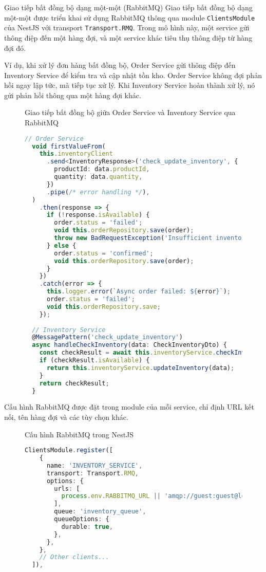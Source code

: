 Giao tiếp bất đồng bộ dạng một-một (RabbitMQ)
Giao tiếp bất đồng bộ dạng một-một được triển khai sử dụng RabbitMQ thông qua module \texttt{ClientsModule} của NestJS với transport \texttt{Transport.RMQ}. Trong mô hình này, một service gửi thông điệp đến một hàng đợi, và một service khác tiêu thụ thông điệp từ hàng đợi đó.

Ví dụ, khi xử lý đơn hàng bất đồng bộ, Order Service gửi thông điệp đến Inventory Service để kiểm tra và cập nhật tồn kho. Order Service không đợi phản hồi ngay lập tức, mà tiếp tục xử lý. Khi Inventory Service hoàn thành xử lý, nó gửi phản hồi thông qua một hàng đợi khác.

\begin{figure}[H]{Giao tiếp bất đồng bộ giữa Order Service và Inventory Service qua RabbitMQ}
  \centering
  \begin{minipage}{\textwidth}
    \begin{lstlisting}[language=Typescript, basicstyle=\scriptsize\ttfamily]
  // Order Service
  void firstValueFrom(
    this.inventoryClient
      .send<InventoryResponse>('check_update_inventory', {
        productId: data.productId,
        quantity: data.quantity,
      })
      .pipe(/* error handling */),
  )
    .then(response => {
      if (!response.isAvailable) {
        order.status = 'failed';
        void this.orderRepository.save(order);
        throw new BadRequestException('Insufficient inventory');
      } else {
        order.status = 'confirmed';
        void this.orderRepository.save(order);
      }
    })
    .catch(error => {
      this.logger.error(`Async order failed: ${error}`);
      order.status = 'failed';
      void this.orderRepository.save;
    });
  
  // Inventory Service
  @MessagePattern('check_update_inventory')
  async handleCheckInventory(data: CheckInventoryDto) {
    const checkResult = await this.inventoryService.checkInventory(data);
    if (checkResult.isAvailable) {
      return this.inventoryService.updateInventory(data);
    }
    return checkResult;
  }
  \end{lstlisting}
  \end{minipage}
\end{figure}

Cấu hình RabbitMQ được đặt trong module của mỗi service, chỉ định URL kết nối, tên hàng đợi và các tùy chọn khác.
\begin{figure}[H]{Cấu hình RabbitMQ trong NestJS}
  \centering
  \begin{minipage}{\textwidth}
    \begin{lstlisting}[language=Typescript, basicstyle=\scriptsize\ttfamily]
  ClientsModule.register([
    {
      name: 'INVENTORY_SERVICE',
      transport: Transport.RMQ,
      options: {
        urls: [
          process.env.RABBITMQ_URL || 'amqp://guest:guest@localhost:5672',
        ],
        queue: 'inventory_queue',
        queueOptions: {
          durable: true,
        },
      },
    },
    // Other clients...
  ]),
  \end{lstlisting}
  \end{minipage}
\end{figure}

